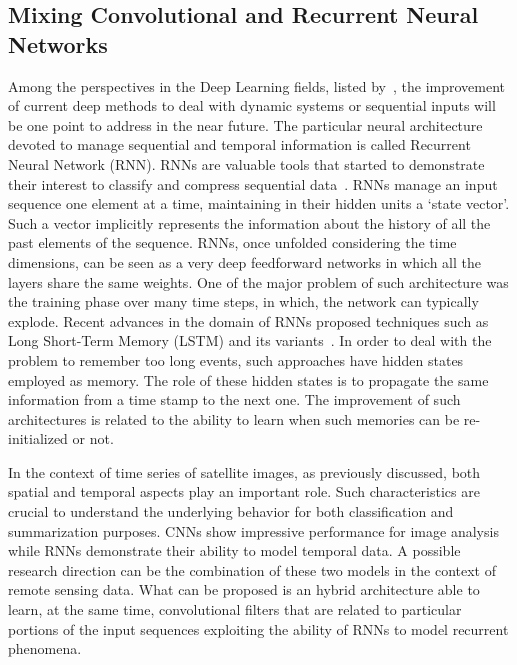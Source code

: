 \subsection{Mixing Convolutional and Recurrent Neural Networks}
Among the perspectives in the Deep Learning fields, listed by~\cite{LeCun15}, the improvement of current deep methods to deal with dynamic systems or sequential inputs will be one point to address in the near future. The particular neural architecture devoted to manage sequential and temporal information is called Recurrent Neural Network (RNN). 
RNNs are valuable tools that started to demonstrate their interest to classify and compress sequential data~\cite{GreffSKSS15}. 
RNNs manage an input sequence one element at a time, maintaining in their hidden units a ‘state vector’. Such a vector implicitly represents the information about the history of all the past elements of the sequence. RNNs, once unfolded considering the time dimensions, can be seen as a very deep feedforward networks in which all the layers share the same weights.
One of the major problem of such architecture was the training phase over many time steps, in which, the network can typically explode. Recent advances in the domain of RNNs proposed techniques such as Long Short-Term Memory (LSTM) and its variants~\cite{GreffSKSS15}. In order to deal with the problem to remember too long events, such approaches have hidden states employed as memory. The role of these hidden states is to propagate the same information from a time stamp to the next one. The improvement of such architectures is related to the ability to learn when such memories can be re-initialized or not.

In the context of time series of satellite images, as previously discussed, both spatial and temporal aspects play an important role. Such characteristics are crucial to understand the underlying behavior for both classification and summarization purposes. CNNs show impressive performance for image analysis while RNNs demonstrate their ability to model temporal data. A possible research direction can be the combination of these two models in the context of remote sensing data. What can be proposed is an hybrid architecture able to learn, at the same time, convolutional filters that are related to particular portions of the input sequences exploiting the ability of RNNs to model recurrent phenomena.

